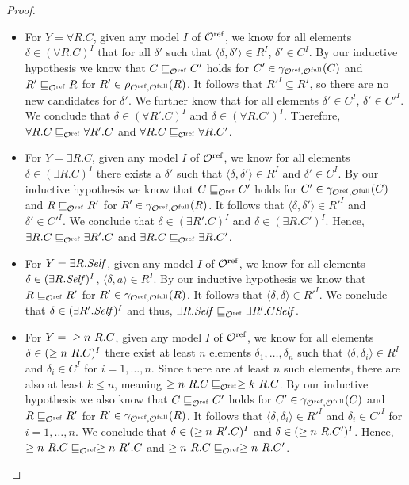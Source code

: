 \begin{proof}
\begin{itemize}
    \item For $Y = \forall R.C$, given any model $I$ of ${\mathcal{O}^\textnormal{ref}}$, we know for all elements $\delta \in (\forall R.C)^I$ that for all $\delta'$ such that $\langle \delta, \delta' \rangle \in R^I$, $\delta' \in C^I$. By our inductive hypothesis we know that $C \sqsubseteq_{\mathcal{O}^\textnormal{ref}} C'$ holds for $C' \in \gamma_{{\mathcal{O}^\textnormal{ref}},{\mathcal{O}^\textnormal{full}}}(C)$ and $R' \sqsubseteq_{\mathcal{O}^\textnormal{ref}} R$ for $R' \in \rho_{{\mathcal{O}^\textnormal{ref}},{\mathcal{O}^\textnormal{full}}}(R)$. It follows that $R'^I \subseteq R^I$, so there are no new candidates for $\delta'$. We further know that for all elements $\delta' \in C^I$, $\delta' \in C'^I$. We conclude that $\delta \in (\forall R'.C)^I$ and $\delta \in (\forall R.C')^I$. Therefore, $\forall R.C \sqsubseteq_{\mathcal{O}^\textnormal{ref}} \forall R'.C$ and $\forall R.C \sqsubseteq_{\mathcal{O}^\textnormal{ref}} \forall R.C'$.
    \item For $Y = \exists R.C$, given any model $I$ of ${\mathcal{O}^\textnormal{ref}}$, we know for all elements $\delta \in (\exists R.C)^I$ there exists a $\delta'$ such that $\langle \delta, \delta' \rangle \in R^I$ and $\delta' \in C^I$. By our inductive hypothesis we know that $C \sqsubseteq_{\mathcal{O}^\textnormal{ref}} C'$ holds for $C' \in \gamma_{{\mathcal{O}^\textnormal{ref}},{\mathcal{O}^\textnormal{full}}}(C)$ and $R \sqsubseteq_{\mathcal{O}^\textnormal{ref}} R'$ for $R' \in \gamma_{{\mathcal{O}^\textnormal{ref}},{\mathcal{O}^\textnormal{full}}}(R)$. It follows that $\langle \delta, \delta' \rangle \in R'^I$ and $\delta' \in C'^I$. We conclude that $\delta \in (\exists R'.C)^I$ and $\delta \in (\exists R.C')^I$. Hence, $\exists R.C \sqsubseteq_{\mathcal{O}^\textnormal{ref}} \exists R'.C$ and $\exists R.C \sqsubseteq_{\mathcal{O}^\textnormal{ref}} \exists R.C'$.
    \item For $Y = \exists R.\mathit{Self}$, given any model $I$ of ${\mathcal{O}^\textnormal{ref}}$, we know for all elements $\delta \in (\exists R.\mathit{Self})^I$, $\langle \delta, a \rangle \in R^I$. By our inductive hypothesis we know that $R \sqsubseteq_{\mathcal{O}^\textnormal{ref}} R'$ for $R' \in \gamma_{{\mathcal{O}^\textnormal{ref}},{\mathcal{O}^\textnormal{full}}}(R)$. It follows that $\langle \delta, \delta \rangle \in R'^I$. We conclude that $\delta \in (\exists R'.\mathit{Self})^I$ and thus, $\exists R.\mathit{Self} \sqsubseteq_{\mathcal{O}^\textnormal{ref}} \exists R'.C\mathit{Self}$.
    \item For $Y ={} \geq n~R.C$, given any model $I$ of ${\mathcal{O}^\textnormal{ref}}$, we know for all elements $\delta \in (\geq n~R.C)^I$ there exist at least $n$ elements $\delta_1, \dots, \delta_n$ such that $\langle \delta, \delta_i \rangle \in R^I$ and $\delta_i \in C^I$ for $i = 1, \dots, n$. Since there are at least $n$ such elements, there are also at least $k \leq n$, meaning $\geq n~R.C \sqsubseteq_{\mathcal{O}^\textnormal{ref}} \geq k~R.C$. By our inductive hypothesis we also know that $C \sqsubseteq_{\mathcal{O}^\textnormal{ref}} C'$ holds for $C' \in \gamma_{{\mathcal{O}^\textnormal{ref}},{\mathcal{O}^\textnormal{full}}}(C)$ and $R \sqsubseteq_{\mathcal{O}^\textnormal{ref}} R'$ for $R' \in \gamma_{{\mathcal{O}^\textnormal{ref}},{\mathcal{O}^\textnormal{full}}}(R)$. It follows that $\langle \delta, \delta_i \rangle \in R'^I$ and $\delta_i \in C'^I$ for $i = 1, \dots, n$. We conclude that $\delta \in (\geq n~R'.C)^I$ and $\delta \in (\geq n~R.C')^I$. Hence, $\geq n~R.C \sqsubseteq_{\mathcal{O}^\textnormal{ref}} \geq n~R'.C$ and $\geq n~R.C \sqsubseteq_{\mathcal{O}^\textnormal{ref}} \geq n~R.C'$.

\end{itemize}
\end{proof}
